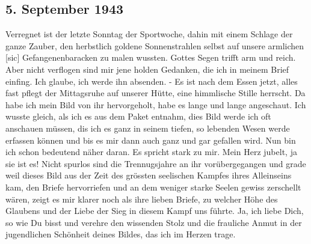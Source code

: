 \subsection{5. September 1943}

Verregnet ist der letzte Sonntag der Sportwoche, dahin mit einem Schlage der ganze Zauber, den herbstlich goldene Sonnenstrahlen selbst auf unsere armlichen{\color{red} [sic] } Gefangenenbaracken zu malen wussten.
Gottes Segen trifft arm und reich.
Aber nicht verflogen sind mir jene holden Gedanken, die ich in meinem Brief einfing.
Ich glaube, ich werde ihn absenden.
- Es ist nach dem Essen jetzt, alles fast pflegt der Mittagsruhe auf unserer H\"{u}tte, eine himmlische Stille herrscht.
Da habe ich mein Bild von ihr hervorgeholt, habe es lange und lange angeschaut.
Ich wusste gleich, als ich es aus dem Paket entnahm, dies Bild werde ich oft anschauen m\"{u}ssen, dis ich es ganz in seinem tiefen, so lebenden Wesen werde erfassen k\"{o}nnen und bis es mir dann auch ganz und gar gefallen wird.
Nun bin ich schon bedeutend n\"{a}her daran.
Es spricht stark zu mir.
Mein Herz jubelt, ja sie ist es!
Nicht spurlos sind die Trennugsjahre an ihr vor\"{u}bergegangen und grade weil dieses Bild aus der Zeit des gr\"{o}ssten seelischen Kampfes ihres Alleinseins kam, den Briefe hervorriefen und an dem weniger starke Seelen gewiss zerschellt w\"{a}ren, zeigt es mir klarer noch als ihre lieben Briefe, zu welcher H\"{o}he des Glaubens und der Liebe der Sieg in diesem Kampf uns f\"{u}hrte.
Ja, ich liebe Dich, so wie Du bisst und verehre den wissenden Stolz und die frauliche Anmut in der jugendlichen Sch\"{o}nheit deines Bildes, das ich im Herzen trage.

\clearpage
